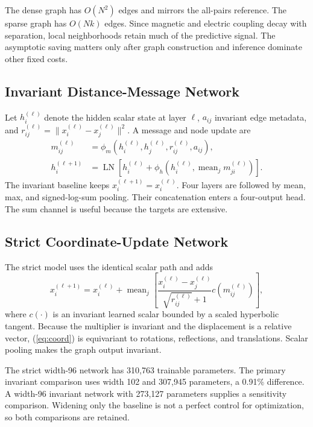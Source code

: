 \documentclass[letterpaper,twocolumn,9pt]{extarticle}
\begin{document}
The dense graph has $O(N^2)$ edges and mirrors the all-pairs reference. The sparse graph has $O(Nk)$ edges. Since magnetic and electric coupling decay with separation, local neighborhoods retain much of the predictive signal. The asymptotic saving matters only after graph construction and inference dominate other fixed costs.

\subsection{Invariant Distance-Message Network}
Let $h_i^{(\ell)}$ denote the hidden scalar state at layer $\ell$, $a_{ij}$ invariant edge metadata, and $r_{ij}^{(\ell)}=\|x_i^{(\ell)}-x_j^{(\ell)}\|^2$. A message and node update are
\begin{align}
m_{ij}^{(\ell)}&=\phi_m\!\left(h_i^{(\ell)},h_j^{(\ell)},r_{ij}^{(\ell)},a_{ij}\right),\\
h_i^{(\ell+1)}&=\operatorname{LN}\!\left[h_i^{(\ell)}+\phi_h\!\left(h_i^{(\ell)},\operatorname{mean}_{j}m_{ji}^{(\ell)}\right)\right].
\end{align}
The invariant baseline keeps $x_i^{(\ell+1)}=x_i^{(\ell)}$. Four layers are followed by mean, max, and signed-log-sum pooling. Their concatenation enters a four-output head. The sum channel is useful because the targets are extensive.

\subsection{Strict Coordinate-Update Network}
The strict model uses the identical scalar path and adds
\begin{equation}
x_i^{(\ell+1)}=x_i^{(\ell)}+\operatorname{mean}_{j}\left[
\frac{x_i^{(\ell)}-x_j^{(\ell)}}{\sqrt{r_{ij}^{(\ell)}}+1}
c\!\left(m_{ij}^{(\ell)}\right)\right],
\label{eq:coord}
\end{equation}
where $c(\cdot)$ is an invariant learned scalar bounded by a scaled hyperbolic tangent. Because the multiplier is invariant and the displacement is a relative vector, (\ref{eq:coord}) is equivariant to rotations, reflections, and translations. Scalar pooling makes the graph output invariant.

The strict width-96 network has 310,763 trainable parameters. The primary invariant comparison uses width 102 and 307,945 parameters, a 0.91\% difference. A width-96 invariant network with 273,127 parameters supplies a sensitivity comparison. Widening only the baseline is not a perfect control for optimization, so both comparisons are retained.
\end{document}
